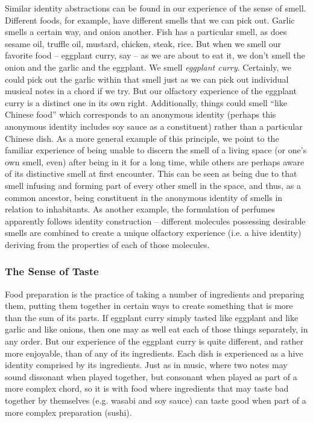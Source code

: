 \documentclass[pra,twocolumn,groupedaddress,10pt]{revtex4}
\theoremstyle{definition}
\begin{document}
Similar identity abstractions can be found in our experience of the sense of smell. Different foods, for example, have different smells that we can pick out. Garlic smells a certain way, and onion another. Fish has a particular smell, as does sesame oil, truffle oil, mustard, chicken, steak, rice. But when we smell our favorite food -- eggplant curry, say -- as we are about to eat it, we don't smell the onion and the garlic and the eggplant. We smell \textit{eggplant curry}. Certainly, we could pick out the garlic within that smell just as we can pick out individual musical notes in a chord if we try. But our olfactory experience of the eggplant curry is a distinct one in its own right. Additionally, things could smell ``like Chinese food'' which corresponds to an anonymous identity (perhaps this anonymous identity includes soy sauce as a constituent) rather than a particular Chinese dish. As a more general example of this principle, we point to the familiar experience of being unable to discern the smell of a living space (or one's own smell, even) after being in it for a long time, while others are perhaps aware of its distinctive smell at first encounter. This can be seen as being due to that smell infusing and forming part of every other smell in the space, and thus, as a common ancestor, being constituent in the anonymous identity of smells in relation to inhabitants. As another example, the formulation of perfumes apparently follows identity construction -- different molecules possessing desirable smells are combined to create a unique olfactory experience (i.e. a hive identity) deriving from the properties of each of those molecules\cite{smellmolecules}.

\subsubsection{The Sense of Taste} \label{sec:sentas}

Food preparation is the practice of taking a number of ingredients and preparing them, putting them together in certain ways to create something that is more than the sum of its parts. If eggplant curry simply tasted like eggplant and like garlic and like onions, then one may as well eat each of those things separately, in any order. But our experience of the eggplant curry is quite different, and rather more enjoyable, than of any of its ingredients. Each dish is experienced as a hive identity comprised by its ingredients. Just as in music, where two notes may sound dissonant when played together, but consonant when played as part of a more complex chord, so it is with food where ingredients that may taste bad together by themselves (e.g. wasabi and soy sauce) can taste good when part of a more complex preparation (sushi).
\end{document}
